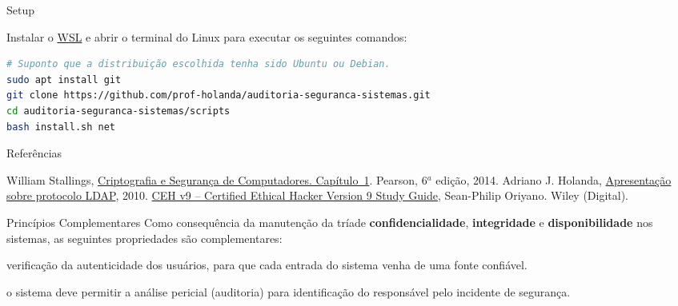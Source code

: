 
\lecturetitle{\course}{\insertlecture}

\frame{\maketitle}

\begin{frame}[fragile]{Setup}

  Instalar o \href{https://docs.microsoft.com/pt-br/windows/wsl/install-win10}{WSL} 
  e abrir o terminal do Linux para executar os seguintes comandos:

\begin{lstlisting}[language=bash,basicstyle=\scriptsize,numberstyle=\tiny\color{gray}]
# Suponto que a distribuição escolhida tenha sido Ubuntu ou Debian.  
sudo apt install git
git clone https://github.com/prof-holanda/auditoria-seguranca-sistemas.git
cd auditoria-seguranca-sistemas/scripts
bash install.sh net
\end{lstlisting}

\end{frame}

\begin{frame}{Referências}

   \begin{thebibliography}{10}
     \beamertemplatebookbibitems
     William Stallings,
     \newblock   \href{https://feituverava.bv3.digitalpages.com.br/users/publications/9788543005898/pages/5}{Criptografia e Segurança de Computadores. Capítulo~1}.
     \newblock Pearson, 6$^a$ edição, 2014.
     Adriano J. Holanda,
     \newblock  \href{https://speakerdeck.com/ajholanda/ldap}{Apresentação sobre protocolo LDAP}, 2010.
     \href{https://www.eccouncil.org/programs/certified-ethical-hacker-ceh/}{CEH v9 -- Certified Ethical Hacker Version 9 Study Guide},
     \newblock Sean-Philip Oriyano.
     \newblock Wiley (Digital).
   \end{thebibliography}
   
\end{frame}

\begin{frame}{Princípios Complementares}
  Como consequência da manutenção da tríade {\bf confidencialidade},
  {\bf integridade} e {\bf disponibilidade} nos sistemas, as seguintes
  propriedades são complementares:
  
  \begin{description}[<+->]
  \item[Autenticidade:] verificação da autenticidade dos usuários, para que cada 
    entrada do sistema venha de uma fonte confiável.
  \item[Responsabilização:] o sistema deve permitir a análise pericial
    (auditoria) para identificação do responsável pelo incidente de
    segurança.
  \end{description}
\end{frame}


